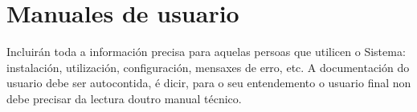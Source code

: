 \chapter{Manuales de usuario}
\label{enlacemanualusuario}

Incluirán toda a información precisa para aquelas persoas que utilicen o Sistema: instalación, utilización, configuración, mensaxes de erro, etc. A documentación do usuario debe ser autocontida, é dicir, para o seu entendemento o usuario final non debe precisar da lectura doutro manual técnico.
